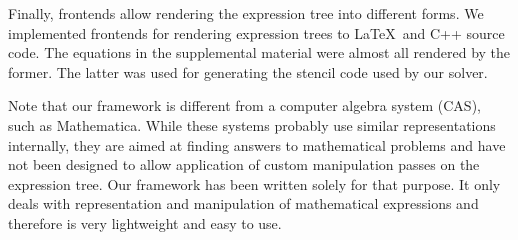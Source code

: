 Finally, frontends allow rendering the expression tree into different forms. We implemented frontends for rendering expression trees to \LaTeX~and C++ source code. The equations in the supplemental material were almost all rendered by the former. The latter was used for generating the stencil code used by our solver.


Note that our framework is different from a computer algebra system (CAS), such as Mathematica. While these systems probably use similar representations internally, they are aimed at finding answers to mathematical problems and have not been designed to allow application of custom manipulation passes on the expression tree. Our framework has been written solely for that purpose. It only deals with representation and manipulation of mathematical expressions and therefore is very lightweight and easy to use.
